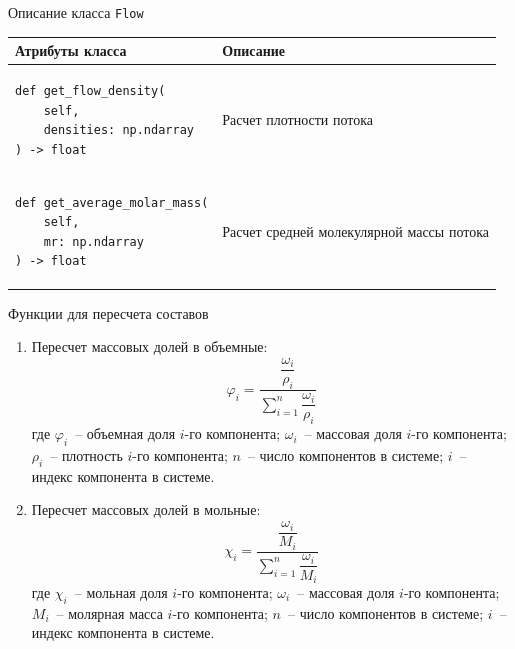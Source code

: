 \documentclass[aspectratio=169, mathserif]{beamer}	%
\begin{document}
\begin{frame}[fragile]{Описание класса \texttt{Flow}}
\scriptsize
\begin{table}[h!]
	\centering
	\renewcommand{\arraystretch}{1.2}
	\begin{tabular}{|p{.49\linewidth}|p{.49\linewidth}|}
		\hline
		\textbf{Атрибуты класса} & \textbf{Описание}  \\
		\hline
\begin{minipage}{\linewidth}
\begin{verbatim}
def get_flow_density(
    self,
    densities: np.ndarray
) -> float
\end{verbatim}
\end{minipage}
		& Расчет плотности потока \\
		\hline
\begin{minipage}{\linewidth}
\begin{verbatim}
def get_average_molar_mass(
    self,
    mr: np.ndarray
) -> float
\end{verbatim}
\end{minipage}
		& Расчет средней молекулярной массы потока \\
		\hline
	\end{tabular}
\end{table}
\vfill
\end{frame}

\begin{frame}[fragile]{Функции для пересчета составов}
\scriptsize
\begin{enumerate}
\item Пересчет массовых долей в объемные:
\vfill
\begin{equation*}
	\varphi _i = \dfrac{\dfrac{\omega _i}{\rho _i}}{\sum \limits _{i=1}^{n} \dfrac{\omega _i}{\rho _i}}
\end{equation*}
\vfill
где $\varphi _i$~-- объемная доля $i$-го компонента; $\omega _i$~-- массовая доля $i$-го компонента; $\rho _i$~-- плотность $i$-го компонента; $n$~-- число компонентов в системе; $i$~-- индекс компонента в системе.
\vfill
\item Пересчет массовых долей в мольные:
\vfill
$$
	\chi _i = \dfrac{\dfrac{\omega _i}{M_i}}{\sum \limits_{i=1}^{n}\dfrac{\omega _i}{M_i}}
$$
\vfill
где $\chi _i$~-- мольная доля $i$-го компонента; $\omega _i$~-- массовая доля $i$-го компонента; $M_i$~-- молярная масса $i$-го компонента; $n$~-- число компонентов в системе; $i$~-- индекс компонента в системе.
\vfill
\end{enumerate}
\vfill
\end{frame}
\end{document}
